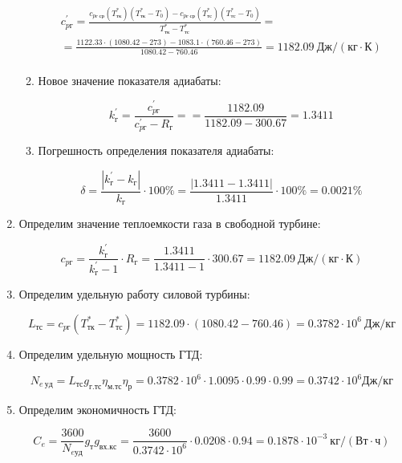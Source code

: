 \documentclass[a4paper,10pt]{article}
\begin{document}
\begin{enumerate}
\begin{enumerate}
		\begin{gather*}
		    c_{pг}^\prime = \frac{
			c_{pг\ ср}(T_{тк}^*) (T_{тк}^* - T_0) - c_{pг\ ср}(T_{тс}^*) (T_{тс}^* - T_0)
		}{
			T_{тк}^* - T_{тс}^*} =\\
		    = \frac{
			1122.33 \cdot (1080.42 - 273) -
			1083.1 \cdot (760.46 - 273)
		}{
			1080.42 - 760.46} =
			1182.09 \ Дж / (кг \cdot К)\\
		\end{gather*}
		
		\item Новое значение показателя адиабаты:
		
		\[
		k_{г}^\prime = \frac{ c_{pг}^\prime }{ c_{pг}^\prime - R_г } = 
				= \frac{ 1182.09 }{ 1182.09 - 300.67} =
				1.3411
		\]
		
		\item Погрешность определения показателя адиабаты:
		
		\[
		\delta = \frac{ \left| k_{г}^\prime - k_{г} \right| }{ k_{г} } \cdot 100 \% =
				\frac{ \left|  1.3411 - 1.3411 \right| }{ 1.3411 } \cdot 100 \% =
				0.0021 \%
		\]
	
	\end{enumerate}
	
	\item Определим значение теплоемкости газа в свободной турбине:
	
	\[
	c_{pг} = \frac{ k_г^\prime }{ k_г^\prime - 1 } \cdot R_г = 
			\frac{ 1.3411 }{ 1.3411 - 1 } \cdot 300.67
			= 1182.09\ Дж/(кг \cdot К)
	\]
	
	\item Определим удельную работу силовой турбины:
	
	\[
	L_{тс} = c_{pг} ( T_{тк}^* -  T_{тс}^*) = 
		1182.09 \cdot ( 1080.42 -  760.46 ) = 
		0.3782 \cdot 10^6\ Дж/кг
	\]
	
	\item Определим удельную мощность ГТД:
	
	
	
	\[
	N_{e\ уд} = L_{тс} g_{г.тс} \eta_{м.тс} \eta_р = 
			0.3782 \cdot 10^6 \cdot 1.0095 \cdot 0.99 \cdot 0.99 =
	0.3742 \cdot 10^6 Дж/кг
	\]
	
	\item Определим экономичность ГТД:
	
	
	
	\[
	C_e = \frac{ 3600 }{ N_{e уд} } g_т g_{вх.кс} = 
			\frac{ 3600 }{ 0.3742 \cdot 10^6} \cdot 0.0208 \cdot 0.94 =
	0.1878 \cdot 10^{-3}\ кг/\left( Вт \cdot ч \right)
	\]
	

\end{enumerate}
\end{document}
